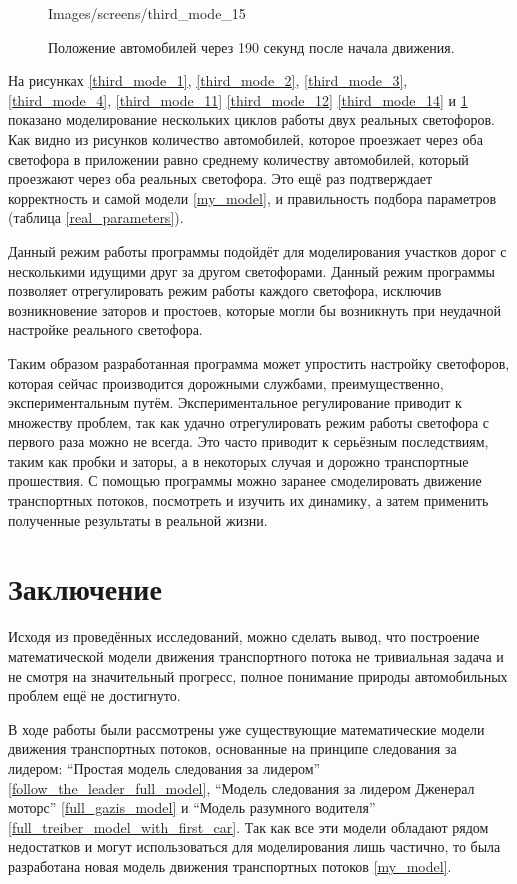\documentclass[12pt, a4paper]{extarticle}
\numberwithin{equation}{section}
\numberwithin{figure}{section}
\begin{document}
\begin{figure}[H]
\begin{center}
\begin{minipage}[h]{0.48\linewidth}
			{Images/screens/third_mode_15}
			\caption{Положение автомобилей через 190 секунд после начала движения.}
			\label{third_mode_15}
		\end{minipage}
	\end{center}
\end{figure}

На рисунках \ref{third_mode_1}, \ref{third_mode_2}, \ref{third_mode_3}, \ref{third_mode_4}, \ref{third_mode_11} \ref{third_mode_12} \ref{third_mode_14} и \ref{third_mode_15} показано моделирование нескольких циклов работы двух реальных светофоров. Как видно из рисунков количество автомобилей, которое проезжает через оба светофора в приложении равно среднему количеству автомобилей, который проезжают через оба реальных светофора. Это ещё раз подтверждает корректность и самой модели \eqref{my_model}, и правильность подбора параметров (таблица \ref{real_parameters}).

Данный режим работы программы подойдёт для моделирования участков дорог с несколькими идущими друг за другом светофорами. Данный режим программы позволяет отрегулировать режим работы каждого светофора, исключив возникновение заторов и простоев, которые могли бы возникнуть при неудачной настройке реального светофора.  

Таким образом разработанная программа может упростить настройку светофоров, которая сейчас производится дорожными службами, преимущественно, экспериментальным путём. Экспериментальное регулирование приводит к множеству проблем, так как удачно отрегулировать режим работы светофора с первого раза можно не всегда. Это часто приводит к серьёзным последствиям, таким как пробки и заторы, а в некоторых случая и дорожно транспортные прошествия. С помощью программы можно заранее смоделировать движение транспортных потоков, посмотреть и изучить их динамику, а затем применить полученные результаты в реальной жизни.

\newpage
\section*{Заключение}
Исходя из проведённых исследований, можно сделать вывод, что построение математической модели  движения транспортного потока не тривиальная задача и не смотря на значительный прогресс, полное понимание природы автомобильных проблем ещё не достигнуто. 

В ходе работы были рассмотрены уже существующие математические модели движения транспортных потоков, основанные на принципе следования за лидером: ``Простая модель следования за лидером''  \eqref{follow_the_leader_full_model}, ``Модель следования за лидером Дженерал моторс''  \eqref{full_gazis_model} и ``Модель разумного водителя'' \eqref{full_treiber_model_with_first_car}. Так как все эти модели обладают рядом недостатков и могут использоваться для моделирования лишь частично, то была разработана новая модель движения транспортных потоков \eqref{my_model}. 
\end{document}
